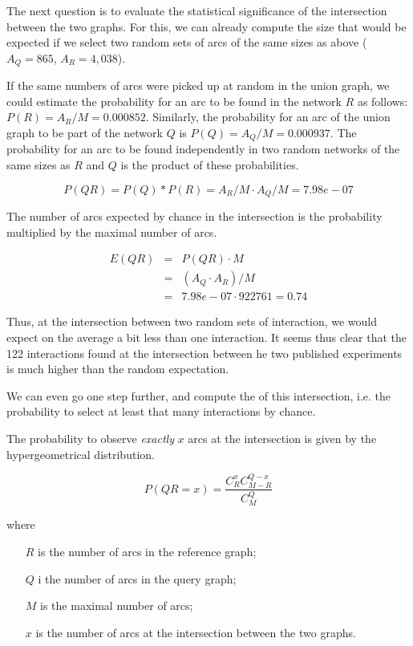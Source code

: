 \begin{enumerate}
The next question is to evaluate the statistical significance of the
intersection between the two graphs. For this, we can already compute
the size that would be expected if we select two random sets of arcs
of the same sizes as above ($A_Q=865$, $A_R=4,038$). 

If the same numbers of arcs were picked up at random in the union
graph, we could estimate the probability for an arc to be found in the
network $R$ as follows: $P(R) = A_R/M = 0.000852$. Similarly, the
probability for an arc of the union graph to be part of the network
$Q$ is $P(Q) = A_Q/M = 0.000937$.  The probability for an arc to be
found independently in two random networks of the same sizes as $R$
and $Q$ is the product of these probabilities.

\[P(QR) = P(Q)*P(R) = A_R/M \cdot A_Q/M = 7.98e-07\]

The number of arcs expected by chance in the intersection is the
probability multiplied by the maximal number of arcs.

\begin{eqnarray*}
E(QR) & = & P(QR) \cdot M  \\
 & = & (A_Q \cdot A_R)/M \\
 & = &  7.98e-07 \cdot 922761 = 0.74
\end{eqnarray*}

Thus, at the intersection between two random sets of interaction, we
would expect on the average a bit less than one interaction. It seems
thus clear that the 122 interactions found at the intersection between
he two published experiments is much higher than the random
expectation.

We can even go one step further, and compute the 
of this intersection, i.e. the probability to select at least that
many interactions by chance. 

The probability to observe \textit{exactly} $x$ arcs at the
intersection is given by the hypergeometrical distribution.

\begin{equation}
\label{eq:hypergeometric_density}
P(QR=x)=\frac{C^{x}_{R}C^{Q-x}_{M-R}}{C^Q_{M}}
\end{equation}

where 
\begin{itemize}
\item[$R$] is the number of arcs in the reference graph;
\item[$Q$] i the number of arcs in the query graph;
\item[$M$] is the maximal number of arcs;
\item[$x$] is the number of arcs at the intersection between the two
  graphs.
\end{itemize}


\end{enumerate}
